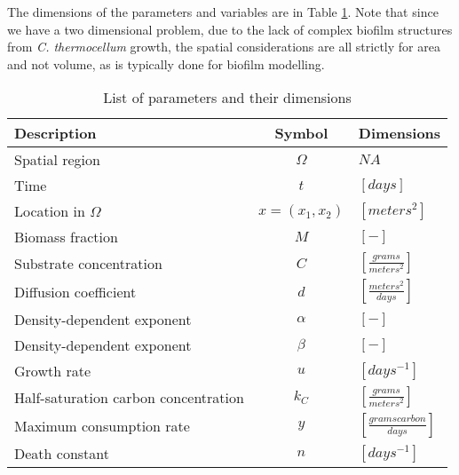  
The dimensions of the parameters and variables are in Table \ref{tab:varDimensions}.
Note that since we have a two dimensional problem, due to the lack of complex biofilm structures from \textit{C. thermocellum} growth, the spatial considerations are all strictly for area and not volume, as is typically done for biofilm modelling.
  \begin{table}[!hbt]
    \centering
    \begin{tabular}{|l |c |l |}
      \hline 
      Description & Symbol & Dimensions \\
      \hline
      \hline
      Spatial region & $\Omega$ &  $NA$ \\
      \hline 
      Time & $t$ & $\left[days\right]$ \\
      Location in $\Omega$ & $x=(x_1,x_2)$ & $\left[meters^2\right]$ \\
      \hline
      Biomass fraction & $M$ & $\left[-\right]$ \\
      Substrate concentration & $C$ & $\left[\frac{grams}{meters^2}\right]$ \\
      \hline
      Diffusion coefficient & $d$ & $\left[\frac{meters^2}{days}\right]$ \\
      Density-dependent exponent & $ \alpha $ & $\left[-\right]$  \\
      Density-dependent exponent & $ \beta  $ & $\left[-\right]$  \\
      Growth rate & $ u $ & $\left[days^{-1} \right]$ \\
      Half-saturation carbon concentration & $ k_C $ & $\left[\frac{grams}{meters^2}\right]$ \\
      Maximum consumption rate & $y$ & $\left[\frac{grams carbon}{days}\right]$  \\
      Death constant & $n$& $\left[days^{-1} \right]$ \\
      \hline
    \end{tabular}
    \caption{List of parameters and their dimensions}
        \label{tab:varDimensions}
  \end{table}


